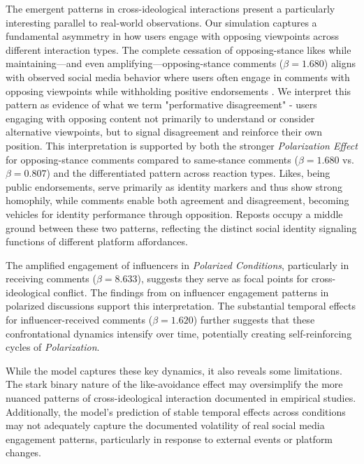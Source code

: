 The emergent patterns in cross-ideological interactions present a particularly interesting parallel to real-world observations. Our simulation captures a fundamental asymmetry in how users engage with opposing viewpoints across different interaction types. The complete cessation of opposing-stance likes while maintaining---and even amplifying---opposing-stance comments ($\beta = 1.680$) aligns with observed social media behavior where users often engage in comments with opposing viewpoints while withholding positive endorsements \citep{bond_political_2022, an_political_2019}. We interpret this pattern as evidence of what we term "performative disagreement" - users engaging with opposing content not primarily to understand or consider alternative viewpoints, but to signal disagreement and reinforce their own position. This interpretation is supported by both the stronger \emph{Polarization Effect} for opposing-stance comments compared to same-stance comments ($\beta = 1.680$ vs. $\beta = 0.807$) and the differentiated pattern across reaction types. Likes, being public endorsements, serve primarily as identity markers and thus show strong homophily, while comments enable both agreement and disagreement, becoming vehicles for identity performance through opposition. Reposts occupy a middle ground between these two patterns, reflecting the distinct social identity signaling functions of different platform affordances.

The amplified engagement of influencers in \emph{Polarized Conditions}, particularly in receiving comments ($\beta = 8.633$), suggests they serve as focal points for cross-ideological conflict. The findings from \citep{soares_influencers_2018} on influencer engagement patterns in polarized discussions support this interpretation. The substantial temporal effects for influencer-received comments ($\beta = 1.620$) further suggests that these confrontational dynamics intensify over time, potentially creating self-reinforcing cycles of \emph{Polarization}.

While the model captures these key dynamics, it also reveals some limitations. The stark binary nature of the like-avoidance effect may oversimplify the more nuanced patterns of cross-ideological interaction documented in empirical studies. Additionally, the model's prediction of stable temporal effects across conditions may not adequately capture the documented volatility of real social media engagement patterns, particularly in response to external events or platform changes.

